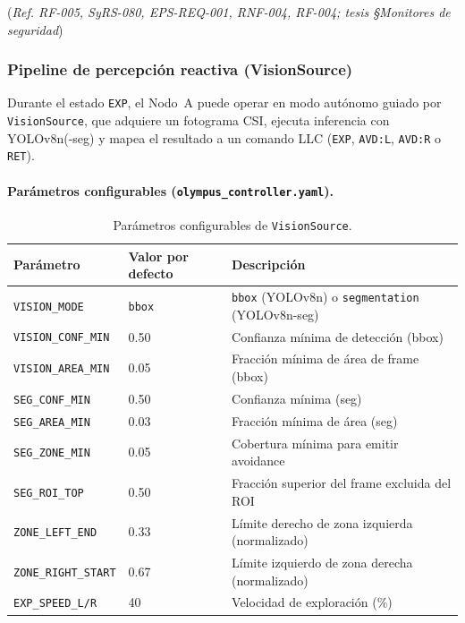 (\emph{Ref. RF-005, SyRS-080, EPS-REQ-001, RNF-004, RF-004; tesis §Monitores de seguridad})

\subsubsection{Pipeline de percepción reactiva (VisionSource)}
\label{sssec:icd_llc_vision}

Durante el estado \texttt{EXP}, el Nodo~A puede operar en modo autónomo
guiado por \texttt{VisionSource}, que adquiere un fotograma CSI,
ejecuta inferencia con YOLOv8n(-seg) y mapea el resultado a un
comando LLC (\texttt{EXP}, \texttt{AVD:L}, \texttt{AVD:R} o \texttt{RET}).

\paragraph{Parámetros configurables (\texttt{olympus\_controller.yaml}).}
\begin{table}[H]
\centering
\small
\renewcommand{\arraystretch}{1.3}
\begin{tabular}{lll}
\toprule
\textbf{Parámetro} & \textbf{Valor por defecto} & \textbf{Descripción} \\
\midrule
\texttt{VISION\_MODE}      & \texttt{bbox}  & \texttt{bbox} (YOLOv8n) o \texttt{segmentation} (YOLOv8n-seg) \\
\texttt{VISION\_CONF\_MIN} & 0.50           & Confianza mínima de detección (bbox) \\
\texttt{VISION\_AREA\_MIN} & 0.05           & Fracción mínima de área de frame (bbox) \\
\texttt{SEG\_CONF\_MIN}    & 0.50           & Confianza mínima (seg) \\
\texttt{SEG\_AREA\_MIN}    & 0.03           & Fracción mínima de área (seg) \\
\texttt{SEG\_ZONE\_MIN}    & 0.05           & Cobertura mínima para emitir avoidance \\
\texttt{SEG\_ROI\_TOP}     & 0.50           & Fracción superior del frame excluida del ROI \\
\texttt{ZONE\_LEFT\_END}   & 0.33           & Límite derecho de zona izquierda (normalizado) \\
\texttt{ZONE\_RIGHT\_START} & 0.67          & Límite izquierdo de zona derecha (normalizado) \\
\texttt{EXP\_SPEED\_L/R}   & 40             & Velocidad de exploración (\%) \\
\bottomrule
\end{tabular}
\caption{Parámetros configurables de \texttt{VisionSource}.}
\label{tab:icd_llc_vision_params}
\end{table}

